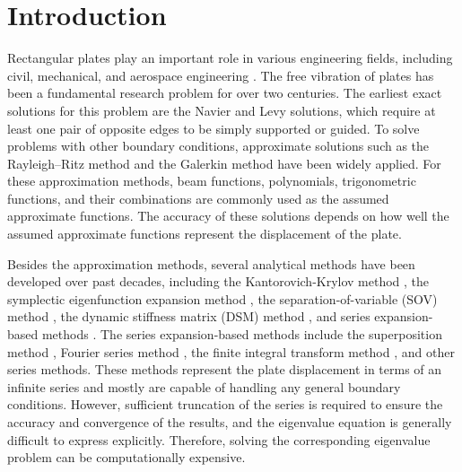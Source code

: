 \documentclass[preprint,12pt]{elsarticle}
\begin{document}
\section{Introduction}
Rectangular plates play an important role in various engineering fields, including civil, mechanical, and aerospace engineering \citep{biancolini2005approximate}. 
The free vibration of plates has been a fundamental research problem for over two centuries. 
The earliest exact solutions for this problem are the Navier \citep{navier1823extrait} and Levy \citep{levy1899equilibre} solutions, which require at least one pair of opposite edges to be simply supported or guided.
To solve problems with other boundary conditions, approximate solutions such as the Rayleigh–Ritz method \cite{leissa1973free} and the Galerkin method \cite{laura1967study} have been widely applied. 
For these approximation methods, beam functions, polynomials, trigonometric functions, and their combinations \cite{li2004vibration} are commonly used as the assumed approximate functions.
The accuracy of these solutions depends on how well the assumed approximate functions represent the displacement of the plate.

Besides the approximation methods, several analytical methods have been developed over past decades, including the Kantorovich-Krylov method \cite{kantorovich1958approximate,kerr1968extension}, the symplectic eigenfunction expansion method \cite{zhong1995new,xing2009new2}, the separation-of-variable (SOV) method \cite{xing2009new}, the dynamic stiffness matrix (DSM) method \cite{banerjee1997dynamic}, and series expansion-based methods \cite{xing2022review}.
The series expansion-based methods include the superposition method \cite{timoshenko1940theory,gorman2005free}, Fourier series method \cite{khov2009accurate,li2009exact}, the finite integral transform method \cite{li2009finite,zhong2013free}, and other series methods. 
These methods represent the plate displacement in terms of an infinite series and mostly are capable of handling any general boundary conditions. 
However, sufficient truncation of the series is required to ensure the accuracy and convergence of the results, and the eigenvalue equation is generally difficult to express explicitly.
Therefore, solving the corresponding eigenvalue problem can be computationally expensive.
\end{document}
